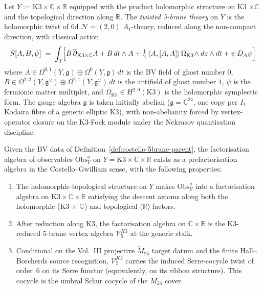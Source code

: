 \begin{definition}
\label{def:costello-5brane-parent}
Let $Y := \mathrm{K3} \times \mathbb{C} \times \mathbb{R}$
equipped with the product holomorphic structure on K3 $\times
\mathbb{C}$ and the topological direction along $\mathbb{R}$.
The \emph{twisted 5-brane theory} on $Y$ is the holomorphic
twist of 6d $\mathcal{N} = (2,0)$ $A_1$-theory, reduced along the
non-compact direction, with classical action
\begin{equation}
\label{eq:costello-5brane-action}
S[A,B,\psi]
 \;=\;
\int_Y\!
\Bigl[
 B\,\overline\partial_{\mathrm{K3}\times\mathbb C} A
 + B\,dt\wedge A
 + \tfrac{1}{2}\,\langle A,[A,A]\rangle\,\Omega_{\mathrm{K3}}\!\wedge dz\wedge dt
 + \psi\,D_A\psi
\Bigr]
\end{equation}
where $A \in \Omega^{0,1}(Y,\mathfrak g)\oplus\Omega^0(Y,\mathfrak g)\,dt$
is the BV field of ghost number $0$,
$B \in \Omega^{2,2}(Y,\mathfrak g^\vee)\oplus\Omega^{2,1}(Y,\mathfrak g^\vee)\,dt$
is the antifield of ghost number $1$, $\psi$ is the fermionic
matter multiplet, and $\Omega_{\mathrm{K3}} \in H^{2,0}(\mathrm{K3})$ is
the holomorphic symplectic form. The gauge algebra $\mathfrak g$ is
taken initially abelian ($\mathfrak g = \mathbb C^{24}$, one copy per
$I_1$ Kodaira fibre of a generic elliptic K3), with
non-abelianity forced by vertex-operator closure on the
K3-Fock module under the Nekrasov quantisation discipline.
\end{definition}

\begin{theorem}
\label{thm:costello-factalg-5brane}
Given the BV data of Definition~\ref{def:costello-5brane-parent},
the factorisation algebra of observables
$\mathrm{Obs}^q_Y$ on $Y = \mathrm{K3}\times\mathbb{C}\times\mathbb{R}$
exists as a prefactorisation algebra in the Costello--Gwilliam
sense, with the following properties:
\begin{enumerate}[label=\textup{(\roman*)}]
\item The holomorphic-topological structure on $Y$ makes
$\mathrm{Obs}^q_Y$ into a factorisation algebra on
$\mathrm{K3}\times\mathbb{C}\times\mathbb{R}$ satisfying the
descent axioms along both the holomorphic
(K3 $\times$ $\mathbb{C}$) and topological ($\mathbb{R}$) factors.
\item After reduction along K3, the factorisation algebra on
$\mathbb{C}\times\mathbb{R}$ is the K3-reduced 5-brane vertex
algebra $\mathcal V^{K3}_5$ at the generic stalk.
\item Conditional on the Vol.~III projective
$\widetilde M_{24}$ target datum and the finite Hall--Borcherds source
recognition, $\mathcal V^{K3}_5$ carries the induced Serre-cocycle
twist of order~$6$ on its Serre functor (equivalently, on its ribbon
structure). This cocycle is the umbral Schur cocycle of the
$M_{24}$ cover.
\end{enumerate}
\end{theorem}


